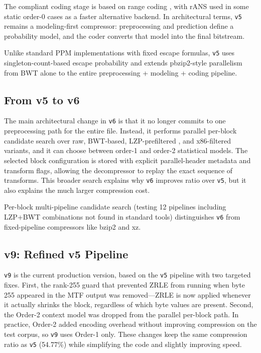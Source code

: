 The compliant coding stage is based on range coding \cite{schindler1998}, with rANS \cite{duda2009} used in some static order-0 cases as a faster alternative backend. In architectural terms, \texttt{v5} remains a modeling-first compressor: preprocessing and prediction define a probability model, and the coder converts that model into the final bitstream.

Unlike standard PPM implementations with fixed escape formulas, \texttt{v5} uses singleton-count-based escape probability and extends pbzip2-style parallelism from BWT alone to the entire preprocessing + modeling + coding pipeline.

\subsection{From v5 to v6}
The main architectural change in \texttt{v6} is that it no longer commits to one preprocessing path for the entire file. Instead, it performs parallel per-block candidate search over raw, BWT-based, LZP-prefiltered \cite{bloom1996}, and x86-filtered variants, and it can choose between order-1 and order-2 statistical models. The selected block configuration is stored with explicit parallel-header metadata and transform flags, allowing the decompressor to replay the exact sequence of transforms. This broader search explains why \texttt{v6} improves ratio over \texttt{v5}, but it also explains the much larger compression cost.

Per-block multi-pipeline candidate search (testing 12 pipelines including LZP+BWT combinations \cite{bloom1996} not found in standard tools) distinguishes \texttt{v6} from fixed-pipeline compressors like bzip2 and xz.

\subsection{v9: Refined v5 Pipeline}
\texttt{v9} is the current production version, based on the \texttt{v5} pipeline with two targeted fixes. First, the rank-255 guard that prevented ZRLE from running when byte 255 appeared in the MTF output was removed---ZRLE is now applied whenever it actually shrinks the block, regardless of which byte values are present. Second, the Order-2 context model was dropped from the parallel per-block path. In practice, Order-2 added encoding overhead without improving compression on the test corpus, so \texttt{v9} uses Order-1 only. These changes keep the same compression ratio as \texttt{v5} (54.77\%) while simplifying the code and slightly improving speed.

